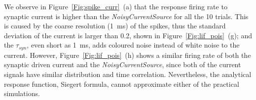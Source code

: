 	We observe in Figure~\ref{Fig:spike_curr}~(a) that the response firing rate to synaptic current is higher than the \textit{NoisyCurrentSource} for all the 10 trials.
	This is caused by the coarse resolution (1~ms) of the spikes, thus the standard deviation of the current is larger than 0.2, shown in Figure~\ref{Fig:lif_pois}~(g);
	and the $\tau_{syn}$, even \DIFaddbegin {}\DIFaddend short as 1~ms, adds coloured noise instead of white noise to the current.
	However, Figure~\ref{Fig:lif_pois}~(h) shows a similar firing rate of both the synaptic driven current and the \textit{NoisyCurrentSource}, since both of the current signals have similar distribution and time correlation.
	Nevertheless, the analytical response function, \DIFaddbegin {}\DIFaddend Siegert formula, cannot approximate either of the practical simulations.

